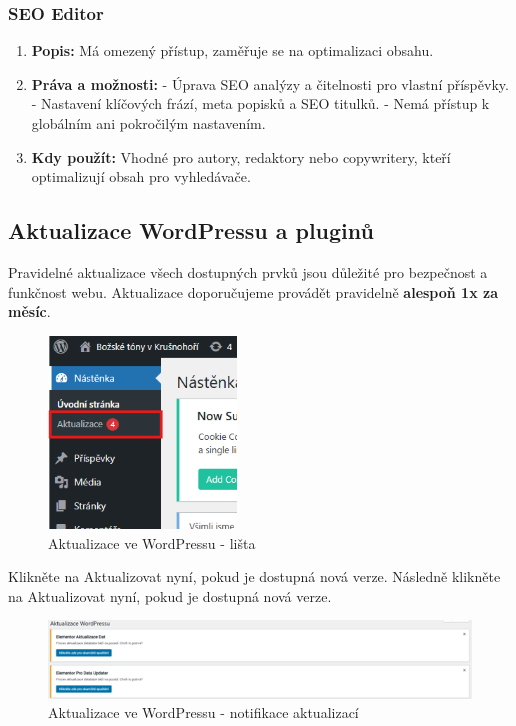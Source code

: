 \documentclass[12pt,a4paper]{article}
\begin{document}
	\subsubsection*{SEO Editor}
	\begin{enumerate}
		\item \textbf{Popis:} Má omezený přístup, zaměřuje se na optimalizaci obsahu.
		\item \textbf{Práva a možnosti:}  
		- Úprava SEO analýzy a čitelnosti pro vlastní příspěvky.  
		- Nastavení klíčových frází, meta popisků a SEO titulků.  
		- Nemá přístup k globálním ani pokročilým nastavením.
		\item \textbf{Kdy použít:} Vhodné pro autory, redaktory nebo copywritery, kteří optimalizují obsah pro vyhledávače.
	\end{enumerate}
	
	\subsection{Aktualizace WordPressu a pluginů}
	Pravidelné aktualizace všech dostupných prvků jsou důležité pro bezpečnost a funkčnost webu. Aktualizace doporučujeme provádět pravidelně \textbf{alespoň 1x za měsíc}.
	
	\begin{figure}[htp]
		\centering
		\includegraphics[width=5cm]{WPupdate1}
		\caption{Aktualizace ve WordPressu - lišta}
		\label{fig:role}
	\end{figure}
	
	Klikněte na Aktualizovat nyní, pokud je dostupná nová verze. Následně klikněte na Aktualizovat nyní, pokud je dostupná nová verze.
	
	\begin{figure}[htp]
		\centering
		\includegraphics[width=18cm]{WPupdatesite}
		\caption{Aktualizace ve WordPressu - notifikace aktualizací}
		\label{fig:role}
	\end{figure}
	
\end{document}
